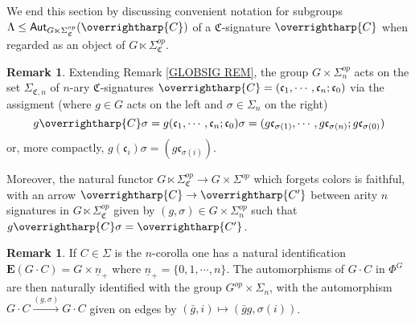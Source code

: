 \documentclass[a4paper,10pt
,draft
]{article}%
\numberwithin{equation}{section}
\numberwithin{figure}{section}
\theoremstyle{definition} %
\newtheorem{remark}[equation]{Remark}%
\newcommand{\vect}[1]{\text{\overrightharp{\ensuremath{#1}}}}
\newcommand{\1}{\ensuremath{\mathbbm 1}}%
\begin{document}
We end this section by discussing convenient notation  
for subgroups 
$\Lambda \leq \mathsf{Aut}_{G \ltimes \Sigma_{\mathfrak{C}}^{op}}(\vect{C})$
of a $\mathfrak{C}$-signature $\vect{C}$
when regarded as an object of 
$G \ltimes \Sigma_{\mathfrak{C}}^{op}$.



\begin{remark}\label{SIGACT REM}
Extending Remark \ref{GLOBSIG REM}, 
the group $G \times \Sigma_n^{op}$
acts on the set $\Sigma_{\mathfrak{C},n}$
of $n$-ary $\mathfrak{C}$-signatures
$\vect{C} = (\mathfrak{c}_1,\cdots,\mathfrak{c}_n;\mathfrak{c}_0)$
via the assigment (where $g \in G$ acts on the left and $\sigma \in \Sigma_n$ on the right)
\begin{equation}\label{SIGACT_EQ}
	g \vect{C} \sigma =
	g (\mathfrak{c}_1,\cdots,\mathfrak{c}_n;\mathfrak{c}_0) \sigma
=
	(g\mathfrak{c}_{\sigma(1)},\cdots,g\mathfrak{c}_{\sigma(n)};g\mathfrak{c}_{\sigma(0)})
\end{equation}
or, more compactly, $g (\mathfrak{c}_i) \sigma = (g \mathfrak{c}_{\sigma(i)})$.

Moreover, the natural functor 
$G \ltimes \Sigma^{op}_{\mathfrak{C}}
\to G \times \Sigma^{op}$
which forgets colors is faithful,
with an arrow
$\vect{C} \to \vect{C'}$
between arity $n$ signatures
in $G \ltimes \Sigma_{\mathfrak{C}}^{op}$
given by 
$(g,\sigma) \in G \times \Sigma_n^{op}$
such that
$g \vect{C} \sigma = \vect{C'}$.
\end{remark}



\begin{remark}\label{GCDOTCATS REM}
If  $C \in \Sigma$ is the $n$-corolla
one has a natural identification
$\boldsymbol{E}(G\cdot C) = G \times \underline{n}_+$
where
$\underline{n}_+ = \{0,1,\cdots,n\}$.
The automorphisms of
$G \cdot C$ in $\Phi^G$
are then naturally identified with the group
$G^{op} \times \Sigma_n$,
with the automorphism
$G \cdot C \xrightarrow{(g,\sigma)} G \cdot C$
given on edges by
$(\bar{g},i) \mapsto (\bar{g}g,\sigma(i))$.
\end{remark}

 
\end{document}
